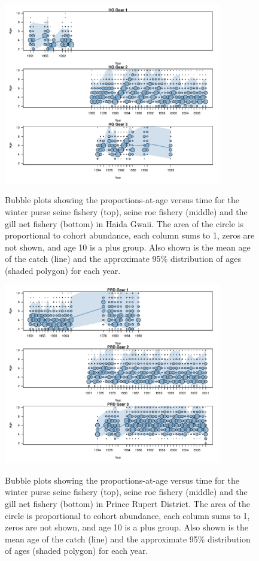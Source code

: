 \begin{figure}
	\centering
	\includegraphics[width=0.85\textwidth]{../Figs/iscam_fig_AgeCompsHG.pdf}\\
	\caption{Bubble plots showing the proportions-at-age versus time for the winter purse seine fishery (top), seine roe fishery (middle) and the gill net fishery (bottom) in Haida Gwaii.  The area of the circle is proportional to cohort abundance, each column sums to 1, zeros are not shown, and age 10 is a plus group. Also shown is the mean age of the catch (line) and the approximate 95\% distribution of ages (shaded polygon) for each year.}\label{FigAgeCompsHG}
\end{figure}

\begin{figure}
	\centering
	\includegraphics[width=0.85\textwidth]{../Figs/iscam_fig_AgeCompsPRD.pdf}\\
	\caption{Bubble plots showing the proportions-at-age versus time for the winter purse seine fishery (top), seine roe fishery (middle) and the gill net fishery (bottom) in Prince Rupert District.  The area of the circle is proportional to cohort abundance, each column sums to 1, zeros are not shown, and age 10 is a plus group. Also shown is the mean age of the catch (line) and the approximate 95\% distribution of ages (shaded polygon) for each year.}\label{FigAgeCompsPRD}
\end{figure}

